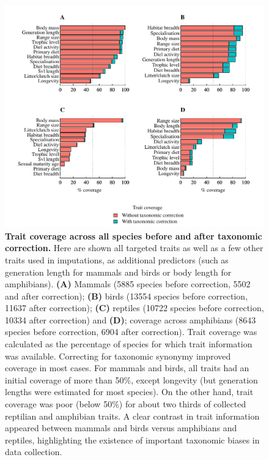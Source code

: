 \begin{figure}[h!]
\centering
\includegraphics[scale=0.85]{figures/chapter2/Trait_coverage/Predictor_traits/All_species}
\caption[Trait coverage across all species before and after taxonomic correction]{\textbf{Trait coverage across all species before and after taxonomic correction.} Here are shown all targeted traits as well as a few other traits used in imputations, as additional predictors (such as generation length for mammals and birds or body length for amphibians). \textbf{(A)} Mammals (5885 species before correction, 5502 and after correction); \textbf{(B)} birds (13554 species before correction, 11637 after correction); \textbf{(C)} reptiles (10722 species before correction, 10334 after correction) and \textbf{(D)}; coverage across amphibians (8643 species before correction, 6904 after correction). Trait coverage was calculated as the percentage of species for which trait information was available. Correcting for taxonomic synonymy improved coverage in most cases. For mammals and birds, all traits had an initial coverage of more than 50\%, except longevity (but generation lengths were estimated for most species). On the other hand, trait coverage was poor (below 50\%) for about two thirds of collected reptilian and amphibian traits. A clear contrast in trait information appeared between mammals and birds versus amphibians and reptiles, highlighting the existence of important taxonomic biases in data collection.}
\label{traitcov}
\end{figure}

